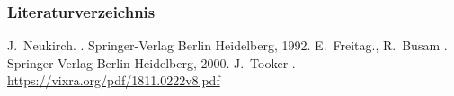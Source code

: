 \begin{frame}
    \frametitle{Literaturverzeichnis}

    \begin{thebibliography}{Freitag und Busam, 2000}
            J.~Neukirch.
            .
            \newblock Springer-Verlag Berlin Heidelberg, 1992.
            E.~Freitag., R.~Busam
            .
            \newblock Springer-Verlag Berlin Heidelberg, 2000.
            J.~Tooker
            .
            \newblock \url{https://vixra.org/pdf/1811.0222v8.pdf}
    \end{thebibliography}
\end{frame}